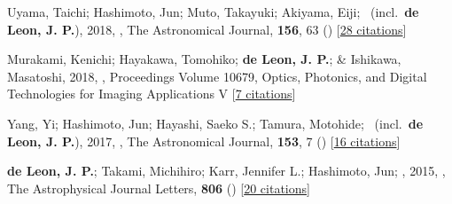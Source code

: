 \item[{\color{numcolor}\scriptsize4}] Uyama, Taichi; Hashimoto, Jun; Muto, Takayuki; Akiyama, Eiji; \etal\ (incl.\ \textbf{de Leon, J. P.}), 2018, , The Astronomical Journal, \textbf{156}, 63 () [\href{https://ui.adsabs.harvard.edu/abs/2018AJ....156...63U}{28 citations}]

\item[{\color{numcolor}\scriptsize3}] Murakami, Kenichi; Hayakawa, Tomohiko; \textbf{de Leon, J. P.}; \& Ishikawa, Masatoshi, 2018, , Proceedings Volume 10679, Optics, Photonics, and Digital Technologies for Imaging Applications V [\href{https://www.spiedigitallibrary.org/conference-proceedings-of-spie/10679/2306621/Real-time-high-speed-motion-blur-compensation-method-using-galvanometer/10.1117/12.2306621.short}{7 citations}]

\item[{\color{numcolor}\scriptsize2}] Yang, Yi; Hashimoto, Jun; Hayashi, Saeko S.; Tamura, Motohide; \etal\ (incl.\ \textbf{de Leon, J. P.}), 2017, , The Astronomical Journal, \textbf{153}, 7 () [\href{https://ui.adsabs.harvard.edu/abs/2017AJ....153....7Y}{16 citations}]

\item[{\color{numcolor}\scriptsize1}] \textbf{de Leon, J. P.}; Takami, Michihiro; Karr, Jennifer L.; Hashimoto, Jun; \etal, 2015, , The Astrophysical Journal Letters, \textbf{806} () [\href{https://ui.adsabs.harvard.edu/abs/2015ApJ...806L..10D}{20 citations}]